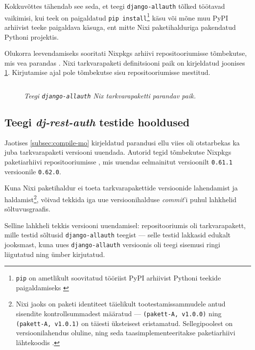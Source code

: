 Kokkuvõttes tähendab see seda, et teegi \texttt{django-allauth} tõlked töötavad vaikimisi, kui teek on paigaldatud \texttt{pip install}\footnote{\texttt{pip} on ametlikult soovitatud tööriist PyPI arhiivist Pythoni teekide paigaldamiseks \cite{pip-standard}} käsu või mõne muu PyPI arhiivist teeke paigaldava käsuga, ent mitte Nixi paketihalduriga pakendatud Pythoni projektis.

Olukorra leevendamiseks sooritati Nixpkgs arhiivi repositooriumisse tõmbekutse, mis vea parandas \cite{nixpkgs-compile-mo}. Nixi tarkvarapaketi definitsiooni paik on kirjeldatud joonises \ref{fig:compile-mo-patch}. Kirjutamise ajal pole tõmbekutse sisu repositooriumisse mestitud. 

\begin{figure}
\inputminted[breaklines]{diff}{chapters/data/compile-mo.diff}
\caption{\emph{Teegi \texttt{django-allauth} Nix tarkvarapaketti parandav paik.}}\label{fig:compile-mo-patch}
\end{figure}

\subsection{Teegi \textit{dj-rest-auth} testide hooldused}

Jaotises \ref{subsec:compile-mo} kirjeldatud parandusi ellu viies oli otstarbekas ka juba tarkvarapaketi versiooni uuendada. Autorid tegid tõmbekutse Nixpkgs paketiarhiivi repositooriumisse \cite{allauth-bump-nixpkgs}, mis uuendas eelmainitut versioonilt \texttt{0.61.1} versioonile \texttt{0.62.0}.

Kuna Nixi paketihaldur ei toeta tarkvarapakettide versioonide lahendamist ja haldamist\footnote{Nixi jaoks on paketi identiteet täielikult tootestamissammudele antud sisendite kontrollsummadest määratud \cite{nixos-how-nix-works} — \texttt{(pakett-A, v1.0.0)} ning \texttt{(pakett-A, v1.0.1)} on täiesti üksteisest eristamatud. Sellegipoolest on versioonilahendus oluline, ning seda taasimplementeeritakse paketiarhiivi lähtekoodis \cite{python3-nix-versioning}.}, võivad tekkida iga uue versioonihalduse \emph{commit}'i puhul lahkhelid sõltuvusgraafis.

Selline lahkheli tekkis versiooni uuendamisel: repositooriumis oli tarkvarapakett, mille testid sõltusid \texttt{django-allauth} teegist \cite{test-dep} — selle testid lakkasid edukalt jooksmast, kuna uues \texttt{django-allauth} versioonis oli teegi sisemusi ringi liigutatud ning ümber kirjutatud.

